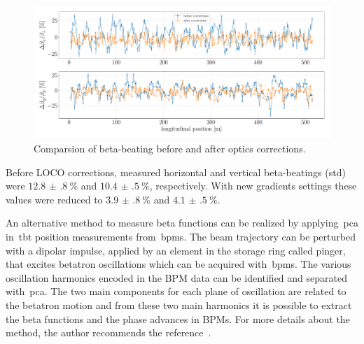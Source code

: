 \begin{figure}
\centering
\includegraphics[width=1.0\textwidth]{figures/beta_beating_progress_big.pdf}
\caption{Comparsion of beta-beating before and after optics corrections.}
\label{fig:beta_beating_progress}
\end{figure}

Before LOCO corrections, measured horizontal and vertical beta-beatings (std) were $\SI{12.8(8)}{\%}$ and $\SI{10.4(5)}{\%}$, respectively. With new gradients settings these values were reduced to $\SI{3.9(8)}{\%}$ and $\SI{4.1(5)}{\%}$.

An alternative method to measure beta functions can be realized by applying~\gls{pca} in~\gls{tbt} position measurements from~\glspl{bpm}. The beam trajectory can be perturbed with a dipolar impulse, applied by an element in the storage ring called pinger, that excites betatron oscillations which can be acquired with~\glspl{bpm}. The various oscillation harmonics encoded in the BPM data can be identified and separated with~\gls{pca}. The two main components for each plane of oscillation are related to the betatron motion and from these two main harmonics it is possible to extract the beta functions and the phase advances in BPMs. For more details about the method, the author recommends the reference~\cite{huang2019beam}.

